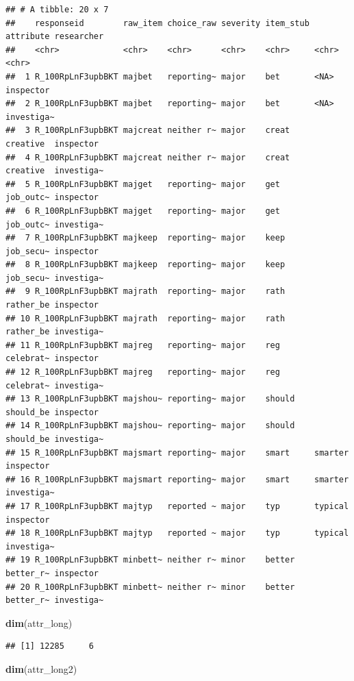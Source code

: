 \documentclass[
]{article}
\newenvironment{Shaded}{\begin{snugshade}}{\end{snugshade}}
\newcommand{\FunctionTok}[1]{\textcolor[rgb]{0.13,0.29,0.53}{\textbf{#1}}}
\newcommand{\NormalTok}[1]{#1}
\begin{document}
\begin{verbatim}
## # A tibble: 20 x 7
##    responseid        raw_item choice_raw severity item_stub attribute researcher
##    <chr>             <chr>    <chr>      <chr>    <chr>     <chr>     <chr>     
##  1 R_100RpLnF3upbBKT majbet   reporting~ major    bet       <NA>      inspector 
##  2 R_100RpLnF3upbBKT majbet   reporting~ major    bet       <NA>      investiga~
##  3 R_100RpLnF3upbBKT majcreat neither r~ major    creat     creative  inspector 
##  4 R_100RpLnF3upbBKT majcreat neither r~ major    creat     creative  investiga~
##  5 R_100RpLnF3upbBKT majget   reporting~ major    get       job_outc~ inspector 
##  6 R_100RpLnF3upbBKT majget   reporting~ major    get       job_outc~ investiga~
##  7 R_100RpLnF3upbBKT majkeep  reporting~ major    keep      job_secu~ inspector 
##  8 R_100RpLnF3upbBKT majkeep  reporting~ major    keep      job_secu~ investiga~
##  9 R_100RpLnF3upbBKT majrath  reporting~ major    rath      rather_be inspector 
## 10 R_100RpLnF3upbBKT majrath  reporting~ major    rath      rather_be investiga~
## 11 R_100RpLnF3upbBKT majreg   reporting~ major    reg       celebrat~ inspector 
## 12 R_100RpLnF3upbBKT majreg   reporting~ major    reg       celebrat~ investiga~
## 13 R_100RpLnF3upbBKT majshou~ reporting~ major    should    should_be inspector 
## 14 R_100RpLnF3upbBKT majshou~ reporting~ major    should    should_be investiga~
## 15 R_100RpLnF3upbBKT majsmart reporting~ major    smart     smarter   inspector 
## 16 R_100RpLnF3upbBKT majsmart reporting~ major    smart     smarter   investiga~
## 17 R_100RpLnF3upbBKT majtyp   reported ~ major    typ       typical   inspector 
## 18 R_100RpLnF3upbBKT majtyp   reported ~ major    typ       typical   investiga~
## 19 R_100RpLnF3upbBKT minbett~ neither r~ minor    better    better_r~ inspector 
## 20 R_100RpLnF3upbBKT minbett~ neither r~ minor    better    better_r~ investiga~
\end{verbatim}

\begin{Shaded}
\begin{Highlighting}[]
\FunctionTok{dim}\NormalTok{(attr\_long)}
\end{Highlighting}
\end{Shaded}

\begin{verbatim}
## [1] 12285     6
\end{verbatim}

\begin{Shaded}
\begin{Highlighting}[]
\FunctionTok{dim}\NormalTok{(attr\_long2)}
\end{Highlighting}
\end{Shaded}
\end{document}

